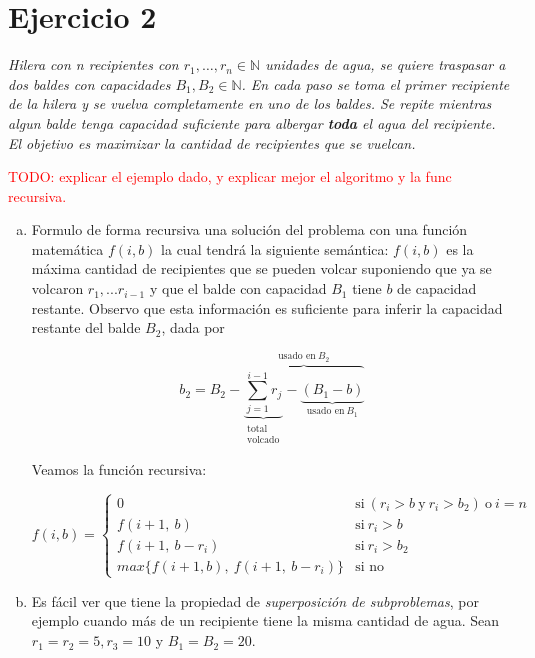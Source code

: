\documentclass[12pt, a4paper]{report}
\theoremstyle{definition} %
\begin{document}
\section*{Ejercicio 2}

\textit{Hilera con n recipientes con $r_1, \ldots, r_n \in \mathbb{N}$ unidades de agua, se quiere traspasar a dos baldes con capacidades $B_1, B_2 \in \mathbb{N}$. En cada paso se toma el primer recipiente de la hilera y se vuelva completamente en uno de los baldes. Se repite mientras algun balde tenga capacidad suficiente para albergar \textbf{toda} el agua del recipiente. El objetivo es maximizar la cantidad de recipientes que se vuelcan.}

\textcolor{red}{TODO: explicar el ejemplo dado, y explicar mejor el algoritmo y la func recursiva.}

\begin{enumerate}[a)]
    \item Formulo de forma recursiva una solución del problema con una función matemática $f(i, b)$ la cual tendrá la siguiente semántica: $f(i, b)$ es la máxima cantidad de recipientes que se pueden volcar suponiendo que ya se volcaron $r_1, ... r_{i-1}$ y que el balde con capacidad $B_1$ tiene $b$ de capacidad restante. Observo que esta información es suficiente para inferir la capacidad restante del balde $B_2$, dada por 
    
    \[ 
        b_2 = B_2 -
            \overbrace{
            \underbrace{\sum_{j=1}^{i-1} r_j}_{\substack{\text{total}\\\text{volcado}}} - 
            \underbrace{(B_1 - b)}_{\text{usado en} \ B_1}
            }^{\text{usado en} \ B_2}
    \]

    Veamos la función recursiva:

    \[ 
        f(i, b) =
            \begin{cases}
                0 & \text{si} \ (r_i > b \ \text{y}\  r_i > b_2) \ \text{o} \ i = n \\
                f(i+1,\ b) &\text{si}\ r_i > b\\
                f(i+1,\ b - r_i) &\text{si}\ r_i > b_2\\
                max\{f(i+1, b),\ f(i+1,\ b - r_i)\} &\text{si no}
            \end{cases}
    \]

    \item Es fácil ver que tiene la propiedad de \textit{superposición de subproblemas}, por ejemplo cuando más de un recipiente tiene la misma cantidad de agua. Sean $r_1 = r_2 = 5, r_3 = 10$ y $B_1 = B_2 = 20$.
    

\end{enumerate}
\end{document}
